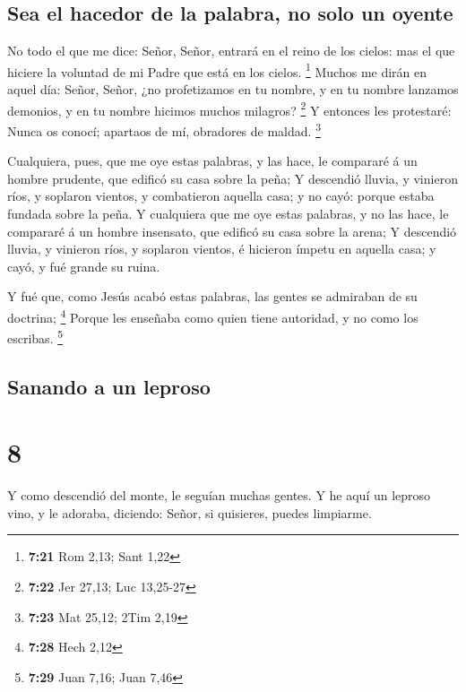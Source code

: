 \hypertarget{sea-el-hacedor-de-la-palabra-no-solo-un-oyente}{%
\subsection{Sea el hacedor de la palabra, no solo un
oyente}\label{sea-el-hacedor-de-la-palabra-no-solo-un-oyente}}

 No todo el que me dice: Señor, Señor, entrará en el reino
de los cielos: mas el que hiciere la voluntad de mi Padre que está en
los cielos. \footnote{\textbf{7:21} Rom 2,13; Sant 1,22} 
Muchos me dirán en aquel día: Señor, Señor, ¿no profetizamos en tu
nombre, y en tu nombre lanzamos demonios, y en tu nombre hicimos muchos
milagros? \footnote{\textbf{7:22} Jer 27,13; Luc 13,25-27} 
Y entonces les protestaré: Nunca os conocí; apartaos de mí, obradores de
maldad. \footnote{\textbf{7:23} Mat 25,12; 2Tim 2,19}

 Cualquiera, pues, que me oye estas palabras, y las hace,
le compararé á un hombre prudente, que edificó su casa sobre la peña;
 Y descendió lluvia, y vinieron ríos, y soplaron vientos, y
combatieron aquella casa; y no cayó: porque estaba fundada sobre la
peña.  Y cualquiera que me oye estas palabras, y no las
hace, le compararé á un hombre insensato, que edificó su casa sobre la
arena;  Y descendió lluvia, y vinieron ríos, y soplaron
vientos, é hicieron ímpetu en aquella casa; y cayó, y fué grande su
ruina.

 Y fué que, como Jesús acabó estas palabras, las gentes se
admiraban de su doctrina; \footnote{\textbf{7:28} Hech 2,12}
 Porque les enseñaba como quien tiene autoridad, y no como
los escribas. \footnote{\textbf{7:29} Juan 7,16; Juan 7,46}

\hypertarget{sanando-a-un-leproso}{%
\subsection{Sanando a un leproso}\label{sanando-a-un-leproso}}

\hypertarget{section-7}{%
\section{8}\label{section-7}}

 Y como descendió del monte, le seguían muchas gentes.
 Y he aquí un leproso vino, y le adoraba, diciendo: Señor,
si quisieres, puedes limpiarme.

